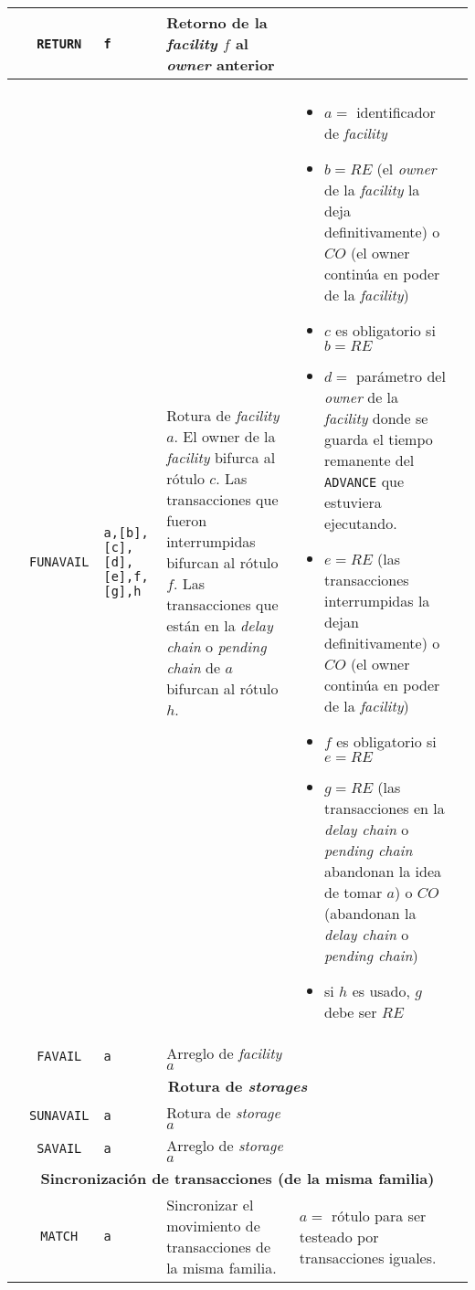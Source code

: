 \documentclass{article}
\providecommand{\tabularnewline}{\\}
\begin{document}
\begin{longtable}{|lc>{\raggedright}p{}|>{\raggedright}p{}|>{\raggedright}p{}|>{\raggedright}p{}|}
\hline
& \texttt{RETURN} & \texttt{f} &
Retorno de la \emph{facility} $f$ al \emph{owner} anterior &  & \tabularnewline

\hline
\pagebreak

\hline
\multicolumn{6}{c}{\textbf{Rotura de \textit{facilities}}} \tabularnewline

\hline
& \texttt{FUNAVAIL} & \texttt{a,[b],[c],[d],[e],f,[g],h} &
Rotura de \emph{facility} $a$. El owner de la \emph{facility} bifurca
al rótulo $c$. Las transacciones que fueron interrumpidas bifurcan
al rótulo $f$. Las transacciones que están en la \emph{delay chain}
o \emph{pending chain} de $a$ bifurcan al rótulo $h$. &
\begin{itemize}
  \item $a=$ identificador de \emph{facility}
  \item $b=RE$ (el \emph{owner} de la \emph{facility} la deja definitivamente)
    o $CO$ (el owner continúa en poder de la \emph{facility})
  \item $c$ es obligatorio si $b=RE$
  \item $d=$ parámetro del \emph{owner} de la \emph{facility} donde se guarda
    el tiempo remanente del \texttt{ADVANCE} que estuviera ejecutando.
  \item $e=RE$ (las transacciones interrumpidas la dejan definitivamente)
    o $CO$ (el owner continúa en poder de la \emph{facility})
  \item $f$ es obligatorio si $e=RE$
  \item $g=RE$ (las transacciones en la \emph{delay chain} o \emph{pending
    chain} abandonan la idea de tomar $a$) o $CO$ (abandonan la \emph{delay
    chain} o \emph{pending chain})
  \item si $h$ es usado, $g$ debe ser $RE$
\end{itemize} & \tabularnewline

\hline
& \texttt{FAVAIL} & \texttt{a} &
Arreglo de \emph{facility} $a$ &  & \tabularnewline

\hline
\multicolumn{6}{c}{\textbf{Rotura de \textit{storages}}} \tabularnewline

\hline
& \texttt{SUNAVAIL} & \texttt{a} &
Rotura de \emph{storage $a$} &  & \tabularnewline

\hline
& \texttt{SAVAIL} & \texttt{a} &
Arreglo de \emph{storage $a$} &  & \tabularnewline

\hline
\multicolumn{6}{c}{\textbf{Sincronización de transacciones (de la misma familia)}} \tabularnewline

\hline
& \texttt{MATCH} & \texttt{a} &
Sincronizar el movimiento de transacciones de la misma familia. &
$a=$ rótulo para ser testeado por transacciones iguales. & \tabularnewline

\hline
\end{longtable}
\end{document}
